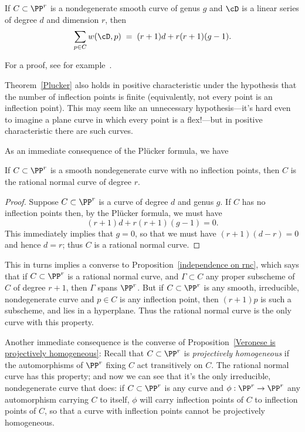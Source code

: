 \begin{theorem}\label{Plucker}
If $C \subset \PP^r$ is a nondegenerate smooth curve of genus $g$ and $\cD$ is a
linear series of degree $d$ and dimension $r$, then
 \begin{equation}\label{Plucker formula}
\sum_{p \in C} w(\cD, p) \; = \; (r+1)d + r(r+1)(g-1).
\end{equation}
\end{theorem}
For a proof, see for example~\cite[Theorem 7.13]{allthat}.

Theorem~\ref{Plucker} also holds in positive characteristic under the hypothesis that the number of inflection points is finite (equivalently, not every point is an inflection point). This may seem like an unnecessary hypothesis---it's hard even to imagine a plane curve in which every point is a flex!---but in positive characteristic there are such curves.

As an immediate consequence of the Pl\"ucker formula, we have

\begin{corollary}\label{uninflected curves}
 If $C\subset \PP^r$ is a smooth nondegenerate curve with no inflection points, then $C$ is the rational normal curve of degree $r$. 
\end{corollary}

\begin{proof}
Suppose $C \subset \PP^r$ is a curve of degree $d$ and genus $g$. If $C$ has no inflection points then, by the Pl\"ucker formula, we must have
$$
(r+1)d + r(r+1)(g-1) = 0.
$$
This immediately implies that $g=0$, so that we must have $(r+1)(d-r) = 0$ and hence $d=r$; thus $C$ is a rational normal curve.
\end{proof}

This in turns implies a converse to  Proposition~\ref{independence on rnc}, which says that if $C \subset \PP^r$ is a rational normal curve, and $\Gamma \subset C$ any proper subscheme of $C$ of degree $r+1$, then $\Gamma$ spans $\PP^r$. But if $C \subset \PP^r$ is any smooth, irreducible, nondegenerate curve and $p \in C$ is any inflection point, then $(r+1)p$ is such a subscheme, and lies in a hyperplane. Thus the rational normal curve is the only curve with this property.


Another immediate consequence is the converse of Proposition~\ref{Veronese is projectively homogeneous}: Recall that $C\subset \PP^r$ is \emph{projectively homogeneous} if the automorphisms of $\PP^r$ fixing
$C$ act transitively on $C$. The rational normal curve has this property; and now we can see that it's the only irreducible, nondegenerate curve that does: if $C \subset \PP^r$ is any curve and $\phi : \PP^r \to \PP^r$ any automorphism carrying $C$ to itself, $\phi$ will carry inflection points of $C$ to inflection points of $C$, so that a curve with inflection points cannot be projectively homogeneous.


